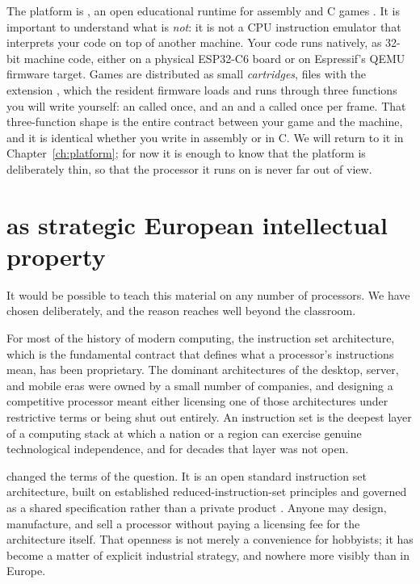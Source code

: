 The platform is \prg, an open educational runtime for \riscv assembly and C games
\citep{prg32repo}. It is important to understand what \prg is \emph{not}: it is
not a CPU instruction emulator that interprets your code on top of another
machine. Your code runs natively, as 32-bit \riscv machine code, either on a
physical ESP32\nobreakdash-C6 board or on Espressif's QEMU firmware target. Games are
distributed as small \emph{cartridges}, files with the extension ,
which the resident firmware loads and runs through three functions you will write
yourself: an  called once, and an  and a 
called once per frame. That three-function shape is the entire contract between
your game and the machine, and it is identical whether you write in assembly or
in C. We will return to it in Chapter~\ref{ch:platform}; for now it is enough to
know that the platform is deliberately thin, so that the processor it runs on is
never far out of view.

\section{\riscv as strategic European intellectual property}

It would be possible to teach this material on any number of processors. We have
chosen \riscv deliberately, and the reason reaches well beyond the classroom.

For most of the history of modern computing, the instruction set architecture, which is
the fundamental contract that defines what a processor's instructions mean, has
been proprietary. The dominant architectures of the desktop, server, and mobile
eras were owned by a small number of companies, and designing a competitive
processor meant either licensing one of those architectures under restrictive
terms or being shut out entirely. An instruction set is the deepest layer of a
computing stack at which a nation or a region can exercise genuine technological
independence, and for decades that layer was not open.

\riscv changed the terms of the question. It is an open standard instruction set
architecture, built on established reduced-instruction-set principles and
governed as a shared specification rather than a private product
\citep{riscvisa}. Anyone may design, manufacture, and sell a \riscv processor
without paying a licensing fee for the architecture itself. That openness is not
merely a convenience for hobbyists; it has become a matter of explicit industrial
strategy, and nowhere more visibly than in Europe.

